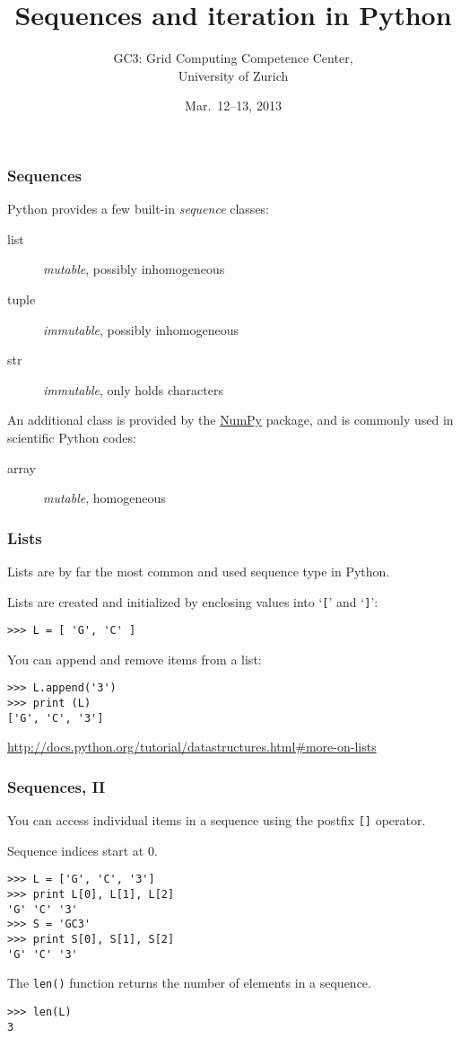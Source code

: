 \documentclass[english,serif,mathserif,xcolor=pdftex,dvipsnames,table]{beamer}
\title[Sequences, Iteration]{%
  Sequences and iteration in Python
}
\author[GC3]{%
  GC3: Grid Computing Competence Center, \\
  University of Zurich
}
\date{Mar.~12--13, 2013}
\begin{document}
\maketitle


\begin{frame}
  \frametitle{Sequences}

  Python provides a few built-in \emph{sequence} classes:
  \begin{description}
  \item[list] \emph{mutable}, possibly inhomogeneous
  \item[tuple] \emph{immutable}, possibly inhomogeneous
  \item[str] \emph{immutable}, only holds characters
  \end{description}
  An additional class is provided by the
  \href{http://numpy.scipy.org}{NumPy} package, and is commonly used in
  scientific Python codes:
  \begin{description}
  \item[array] \emph{mutable}, homogeneous
  \end{description}
\end{frame}


\begin{frame}[fragile]
  \frametitle{Lists}
  Lists are by far the most common and used sequence type in Python.

  \+
  Lists are created and initialized by enclosing values into
  `\texttt{[}' and `\texttt{]}':
\begin{lstlisting}
>>> L = [ 'G', 'C' ]
\end{lstlisting}

  \+
  You can append and remove items from a list:
\begin{lstlisting}
>>> L.append('3')
>>> print (L)
['G', 'C', '3']
\end{lstlisting}

  \+
  \begin{references}
    \url{http://docs.python.org/tutorial/datastructures.html#more-on-lists}
  \end{references}
\end{frame}


\begin{frame}
  \frametitle{Sequences, II}
  You can access individual items in a sequence using the postfix
  \texttt{[]} operator.

  \+
  Sequence indices start at 0.
\begin{lstlisting}
>>> L = ['G', 'C', '3']
>>> print L[0], L[1], L[2]
'G' 'C' '3'
>>> S = 'GC3'
>>> print S[0], S[1], S[2]
'G' 'C' '3'
\end{lstlisting}

  \+
  The \texttt{len()} function returns the number of elements in a
  sequence.
\begin{lstlisting}
>>> len(L)
3
\end{lstlisting}
\end{frame}
\end{document}
